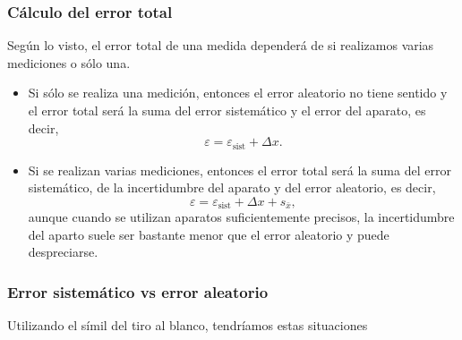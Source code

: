 \begin{frame}
	\frametitle{Cálculo del error total}
	Según lo visto, el error total de una medida dependerá de si realizamos varias mediciones o sólo una.
	
	\begin{itemize}
		\item {} Si sólo se realiza una medición, entonces el error aleatorio no tiene sentido y
		      el error total será la suma del error sistemático y el error del aparato, es decir,
		      \[
		      	\varepsilon = \varepsilon_{\textrm{sist}}+\Delta x.
		      \]
		\item {} Si se realizan varias mediciones, entonces el error total será la suma del
		      error sistemático, de la incertidumbre del aparato y del error aleatorio, es decir,
		      \[
		      	\varepsilon = \varepsilon_{\textrm{sist}}+\Delta x+s_{\bar x},
		      \]
		      aunque cuando se utilizan aparatos suficientemente precisos, la incertidumbre del aparto suele ser bastante menor que
		      el error aleatorio y puede despreciarse.
	\end{itemize} 
\end{frame}


\begin{frame}
	\frametitle{Error sistemático vs error aleatorio}
	Utilizando el símil del tiro al blanco, tendríamos estas situaciones
	\begin{center}
		\scalebox{1}{}
	\end{center}
\end{frame}



